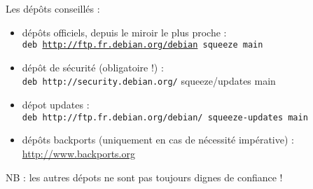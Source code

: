 \documentclass[french]{beamer}
\begin{document}
\begin{frame}
\begin{block}{ Les dépôts conseillés :}
	\begin{itemize}
	\item dépôts officiels, depuis le miroir le plus proche : \\
	 \texttt{deb \url{http://ftp.fr.debian.org/debian} squeeze main}
	\item dépôt de sécurité (obligatoire !) : \\
	 \texttt{deb http://security.debian.org/} squeeze/updates main
	\item dépot updates : \\
	\texttt{deb http://ftp.fr.debian.org/debian/ squeeze-updates main}
	\item dépôts backports (uniquement en cas de nécessité impérative) : \url{http://www.backports.org}
	\end{itemize}
\end{block}
NB : les autres dépots ne sont pas toujours dignes de confiance !
\end{frame}









\end{document}
